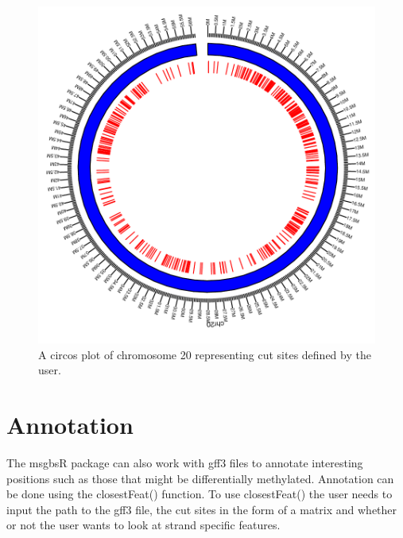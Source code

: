 \documentclass{article}
\begin{document}
\begin{figure}
\begin{center}
\includegraphics{msgbsR_Vignette-fig2}
\end{center}
\caption{A circos plot of chromosome 20 representing cut sites defined by the user.}
\label{fig:fig2}
\end{figure}

\clearpage

\section{Annotation}

The msgbsR package can also work with gff3 files to annotate interesting positions such as those that might be differentially methylated. Annotation can be done using the closestFeat() function. To use closestFeat() the user needs to input the path to the gff3 file, the cut sites in the form of a matrix and whether or not the user wants to look at strand specific features.
\end{document}
